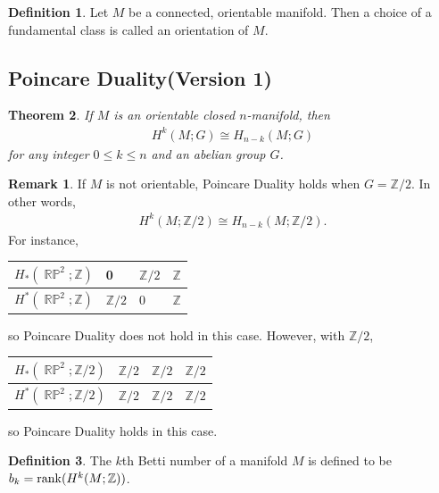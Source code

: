 \documentclass[psamsfonts]{amsart}
\newtheorem{thm}{Theorem}[section]
\theoremstyle{definition}
\newtheorem{defn}[thm]{Definition}
\theoremstyle{rem}
\newtheorem*{rem}{Remark}
\DeclareMathOperator{\RP}{\mathbb{R}\mathbb{P}}
\numberwithin{equation}{section}
\begin{document}
\begin{defn}
  Let $M$ be a connected, orientable manifold.
  Then a choice of a fundamental class is called an orientation of $M$.
\end{defn}

\subsection{Poincare Duality(Version 1)}

\begin{thm}\label{poincare_duality_1}
  If $M$ is an orientable closed $n$-manifold, then
  \begin{align*}
    H^k(M; G) \cong H_{n - k}(M; G)
  \end{align*}
  for any integer $0 \leq k \leq n$ and an abelian group $G$.
\end{thm}

\begin{rem}
  If $M$ is not orientable, Poincare Duality holds when $G = \mathbb{Z} / 2$.
  In other words,
  \begin{align*}
    H^k(M; \mathbb{Z} / 2) \cong H_{n - k}(M; \mathbb{Z} / 2).
  \end{align*}
  For instance,
  \begin{center}
    \begin{tabular}{| l | l | l | l |} \hline
      $H_{\ast}(\RP^2; \mathbb{Z})$ & 0                & $\mathbb{Z} / 2$ & $\mathbb{Z}$ \\ \hline
      $H^{\ast}(\RP^2; \mathbb{Z})$ & $\mathbb{Z} / 2$ & 0                & $\mathbb{Z}$ \\ \hline
    \end{tabular}
  \end{center}
  so Poincare Duality does not hold in this case.
  However, with $\mathbb{Z} / 2$,
  \begin{center}
    \begin{tabular}{| l | l | l | l |} \hline
      $H_{\ast}(\RP^2; \mathbb{Z} / 2)$ & $\mathbb{Z} / 2$ & $\mathbb{Z} / 2$ & $\mathbb{Z} / 2$ \\ \hline
      $H^{\ast}(\RP^2; \mathbb{Z} / 2)$ & $\mathbb{Z} / 2$ & $\mathbb{Z} / 2$ & $\mathbb{Z} / 2$ \\ \hline
    \end{tabular}
  \end{center}
  so Poincare Duality holds in this case.
\end{rem}

\begin{defn}
  The $k$th Betti number of a manifold $M$ is defined to be $b_k = \rank(H^k(M; \mathbb{Z}))$.
\end{defn}
\end{document}
